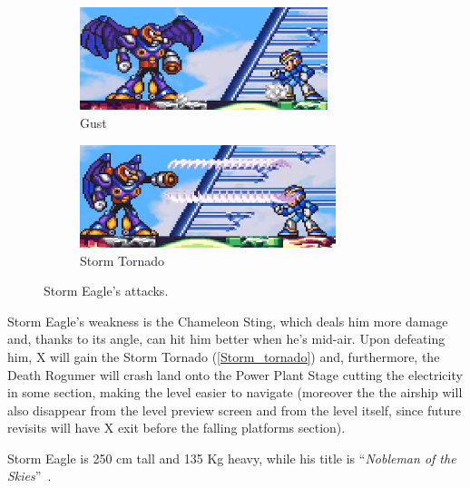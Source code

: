 \begin{figure}[htp]
	\ContinuedFloat
	\centering
	\begin{subfigure}{\linewidth}
		\centering
		\includegraphics[height=3cm]{figures/X1/Storm_eagle/Eagle_push.jpg}
		\caption{Gust}
	\end{subfigure}
	\begin{subfigure}{\linewidth}
		\centering
		\includegraphics[height=3cm]{figures/X1/Storm_eagle/Eagle_tornado.jpg}
		\caption{Storm Tornado}
	\end{subfigure}
	\caption{Storm Eagle's attacks.}
\end{figure}
Storm Eagle's weakness is the Chameleon Sting, which deals him more damage and, thanks to its angle, can hit him better when he's mid-air. Upon defeating him, X will gain the Storm Tornado (\ref{Storm_tornado}) and, furthermore, the Death Rogumer will crash land onto the Power Plant Stage cutting the electricity in some section, making the level easier to navigate (moreover the the airship will also disappear from the level preview screen and from the level itself, since future revisits will have X exit before the falling platforms section).

Storm Eagle is 250 cm tall and 135 Kg heavy, while his title is ``\textit{Nobleman of the Skies}''~\cite{book:MMX_Complete_art}.

